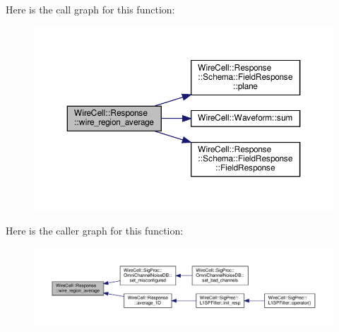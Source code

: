 Here is the call graph for this function\+:
\nopagebreak
\begin{figure}[H]
\begin{center}
\leavevmode
\includegraphics[width=350pt]{namespace_wire_cell_1_1_response_a11620870420942188de46612d3e2022f_cgraph}
\end{center}
\end{figure}
Here is the caller graph for this function\+:
\nopagebreak
\begin{figure}[H]
\begin{center}
\leavevmode
\includegraphics[width=350pt]{namespace_wire_cell_1_1_response_a11620870420942188de46612d3e2022f_icgraph}
\end{center}
\end{figure}
